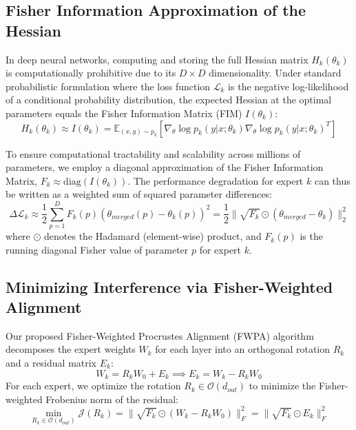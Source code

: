 \documentclass{article}
\theoremstyle{plain}
\theoremstyle{definition}
\theoremstyle{remark}
\begin{document}
\subsection{Fisher Information Approximation of the Hessian}
In deep neural networks, computing and storing the full Hessian matrix $H_k(\theta_k)$ is computationally prohibitive due to its $D \times D$ dimensionality. Under standard probabilistic formulation where the loss function $\mathcal{L}_k$ is the negative log-likelihood of a conditional probability distribution, the expected Hessian at the optimal parameters equals the Fisher Information Matrix (FIM) $I(\theta_k)$:
\begin{equation}
    H_k(\theta_k) \approx I(\theta_k) = \mathbb{E}_{(x, y) \sim p_k} \left[ \nabla_\theta \log p_k(y | x; \theta_k) \nabla_\theta \log p_k(y | x; \theta_k)^T \right]
\end{equation}

To ensure computational tractability and scalability across millions of parameters, we employ a diagonal approximation of the Fisher Information Matrix, $F_k \approx \text{diag}(I(\theta_k))$. The performance degradation for expert $k$ can thus be written as a weighted sum of squared parameter differences:
\begin{equation}
    \Delta \mathcal{L}_k \approx \frac{1}{2} \sum_{p=1}^D F_k(p) \left( \theta_{merged}(p) - \theta_k(p) \right)^2 = \frac{1}{2} \| \sqrt{F_k} \odot (\theta_{merged} - \theta_k) \|_2^2
\end{equation}
where $\odot$ denotes the Hadamard (element-wise) product, and $F_k(p)$ is the running diagonal Fisher value of parameter $p$ for expert $k$.

\subsection{Minimizing Interference via Fisher-Weighted Alignment}
Our proposed Fisher-Weighted Procrustes Alignment (FWPA) algorithm decomposes the expert weights $W_k$ for each layer into an orthogonal rotation $R_k$ and a residual matrix $E_k$:
\begin{equation}
    W_k = R_k W_0 + E_k \implies E_k = W_k - R_k W_0
\end{equation}
For each expert, we optimize the rotation $R_k \in \mathcal{O}(d_{out})$ to minimize the Fisher-weighted Frobenius norm of the residual:
\begin{equation}
    \min_{R_k \in \mathcal{O}(d_{out})} \mathcal{J}(R_k) = \| \sqrt{F_k} \odot (W_k - R_k W_0) \|_F^2 = \| \sqrt{F_k} \odot E_k \|_F^2
\end{equation}
\end{document}
